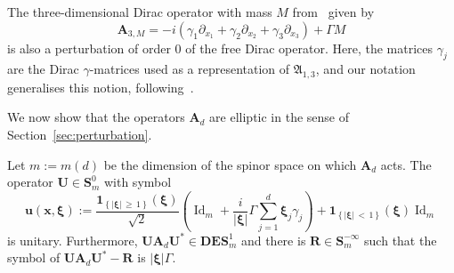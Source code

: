 \documentclass[AHL,Unicode,longabstracts,published]{cedram}
\DeclareMathOperator{\Id}{Id}
\newcommand{\bxi}{\boldsymbol \xi}
\newcommand{\bone}{\boldsymbol 1}
\newcommand{\BA}{\mathbf A}
\newcommand{\BD}{\mathbf D}
\newcommand{\BE}{\mathbf E}
\newcommand{\BS}{\mathbf S}
\newcommand{\BR}{\mathbf R}
\newcommand{\BU}{\mathbf U}
\newcommand{\bx}{\mathbf x}
\newcommand{\bu}{\mathbf u}
\newcommand{\FA}{\mathfrak A}
\newcommand{\del}{\partial}
\newcommand{\abs}[1]{\left\lvert #1 \right\rvert}
\newcommand{\set}[1]{\left\{ #1 \right\}}
\begin{document}
\begin{exem}
The three-dimensional Dirac operator with mass $M$ from~\cite[Equation 1.11]{thaller} given by
\begin{equation}
\BA_{3,M} = -i\left(\gamma_1 \del_{x_1} + \gamma_2 \del_{x_2} + \gamma_3
\del_{x_3}\right) + \Gamma M
\end{equation}
is also a perturbation of order $0$ of the free Dirac operator. Here, the matrices $\gamma_j$ are the Dirac $\gamma$-matrices used as a representation of $\FA_{1,3}$, and our notation generalises this notion, following~\cite{Upmeier}.
\end{exem}

We now show that the operators $\BA_d$ are elliptic in the sense of Section~\ref{sec:perturbation}.

\begin{prop}\label{prop:diagdirac}
Let $m:= m(d)$ be the dimension of the spinor space on which $\BA_d$ acts. The operator $\BU \in \BS^0_m$ with symbol
\begin{equation}\label{eq:explicitunitary}
\bu(\bx,\bxi) := \frac{\bone_{\set{\abs \bxi\,\ge\,1}}(\bxi)}{\sqrt 2}\left(\Id_m + \frac{i}{\abs \bxi} \Gamma
\sum_{j=1}^d \bxi_j \gamma_j\right)+
\bone_{\set{\abs{\bxi}\,<\,1}}(\bxi)\Id_m
\end{equation}
is unitary. Furthermore, $\BU \BA_d \BU^* \in \BD\BE\BS_m^1$ and there is $\BR
\in \BS_m^{-\infty}$ such that the symbol of $\BU \BA_d \BU^* - \BR$ is $\abs{\bxi} \Gamma$.
\end{prop}
\end{document}
